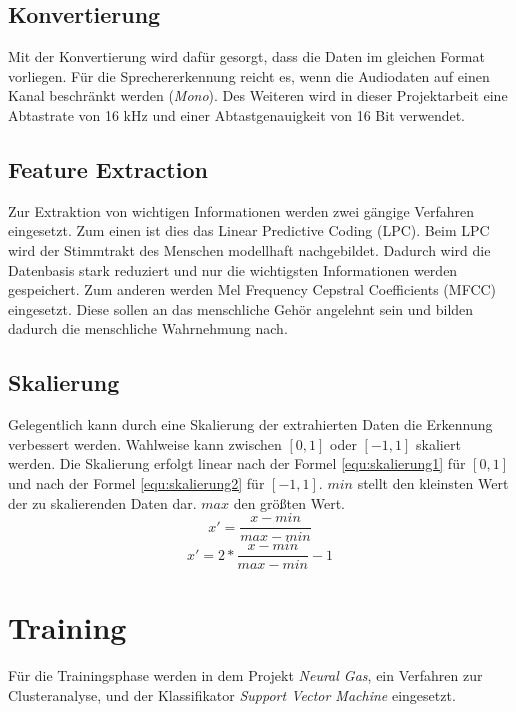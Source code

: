 \subsection{Konvertierung}
Mit der Konvertierung wird dafür gesorgt, dass die Daten im gleichen Format vorliegen. Für die Sprechererkennung reicht es, wenn die Audiodaten auf einen Kanal beschränkt werden (\emph{Mono}). Des Weiteren wird in dieser Projektarbeit eine Abtastrate von 16 kHz und einer Abtastgenauigkeit von 16 Bit verwendet.

\subsection{Feature Extraction}
Zur Extraktion von wichtigen Informationen werden zwei gängige Verfahren eingesetzt. Zum einen ist dies das Linear Predictive Coding (LPC). Beim LPC wird der Stimmtrakt des Menschen modellhaft nachgebildet. Dadurch wird die Datenbasis stark reduziert und nur die wichtigsten Informationen werden gespeichert. Zum anderen werden Mel Frequency Cepstral Coefficients (MFCC) eingesetzt. Diese sollen an das menschliche Gehör angelehnt sein und bilden dadurch die menschliche Wahrnehmung nach.

\subsection{Skalierung}
Gelegentlich kann durch eine Skalierung der extrahierten Daten die Erkennung verbessert werden. Wahlweise kann zwischen $[0,1]$ oder $[-1,1]$ skaliert werden. Die Skalierung erfolgt linear nach der Formel \ref{equ:skalierung1} für $[0,1]$ und nach der Formel \ref{equ:skalierung2} für $[-1,1]$. $min$ stellt den kleinsten Wert der zu skalierenden Daten dar. $max$ den größten Wert. \cite{bib:svmfaq}
\begin{equation}
	\label{equ:skalierung1}
	x'=\frac{x-min}{max-min}
\end{equation}
\begin{equation}
	\label{equ:skalierung2}
	x'=2*\frac{x-min}{max-min}-1
\end{equation}

\section{Training}
Für die Trainingsphase werden in dem Projekt \emph{Neural Gas}, ein Verfahren zur Clusteranalyse, und der Klassifikator \emph{Support Vector Machine} eingesetzt. 

